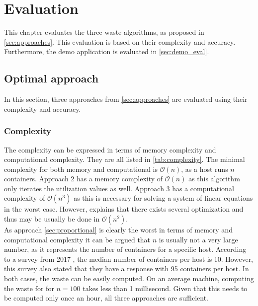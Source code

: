 \chapter{Evaluation}\label{ch:evaluation}
This chapter evaluates the three waste algorithms, as proposed in \autoref{sec:approaches}. This evaluation is based on their complexity and accuracy. Furthermore, the demo application is evaluated in \autoref{sec:demo_eval}.


\section{Optimal approach} \label{sec:optimal_approach}
In this section, three approaches from \autoref{sec:approaches} are evaluated using their complexity and accuracy. 

\subsection{Complexity}
The complexity can be expressed in terms of memory complexity and computational complexity. They are all listed in \autoref{tab:complexity}. The minimal complexity for both memory and computational is $\mathcal{O}(n)$, as a host runs $n$ containers. Approach 2 has a memory complexity of $\mathcal{O}(n)$ as this algorithm only iterates the utilization values as well. Approach 3 has a computational complexity of $\mathcal{O}(n^3)$ as this is necessary for solving a system of linear equations in the worst case. However, \cite{pan1991complexity} explains that there exists several optimization and thus may be usually be done in $\mathcal{O}(n^2)$.\\

\noindent
As approach \ref{sec:proportional} is clearly the worst in terms of memory and computational complexity it can be argued that $n$ is usually not a very large number, as it represents the number of containers for a specific host. According to a survey from 2017 \cite{docker_report}, the median number of containers per host is 10. However, this survey also stated that they have a response with 95 containers per host. In both cases, the waste can be easily computed. On an average machine, computing the waste for for $n = 100$ takes less than 1 millisecond. Given that this needs to be computed only once an hour, all three approaches are sufficient.

